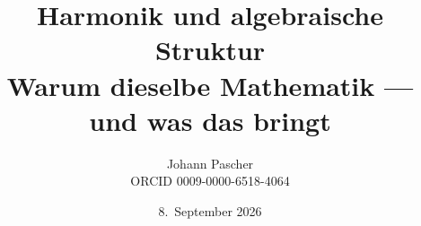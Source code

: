 \documentclass[11pt,a4paper]{report}
\title{Harmonik und algebraische Struktur\\[0.5em]
  \large Warum dieselbe Mathematik --- und was das bringt}
\date{8.~September 2026}
\author{Johann Pascher\\\small ORCID 0009-0000-6518-4064}
\begin{document}
\renewcommand{\thechapter}{}
\renewcommand{\thesection}{\arabic{section}}
\maketitle
\tableofcontents

\end{document}
